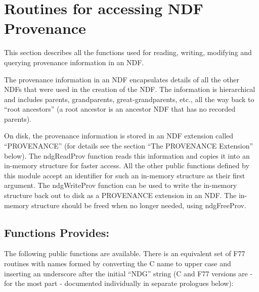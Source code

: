 \documentclass[twoside,11pt,nolof]{starlink}
\begin{document}
\newpage

\section{Routines for accessing NDF Provenance}

This section describes all the functions used for reading, writing,
modifying and querying provenance information in an NDF.

The provenance information in an NDF encapsulates details of all the
other NDFs that were used in the creation of the NDF. The information is
hierarchical and includes parents, grandparents, great-grandparents,
etc., all the way back to ``root ancestors'' (a root ancestor is an ancestor
NDF that has no recorded parents).

On disk, the provenance information is stored in an NDF extension called
``PROVENANCE'' (for details see the section ``The PROVENANCE Extension''
below). The ndgReadProv function reads this information and copies it
into an in-memory structure for faster access. All the other public
functions defined by this module accept an identifier for such an
in-memory structure as their first argument. The ndgWriteProv function
can be used to write the in-memory structure back out to disk as a
PROVENANCE extension in an NDF. The in-memory structure should be freed
when no longer needed, using ndgFreeProv.

\subsection{Functions Provides:}
The following public functions are available. There is an equivalent set
of F77 routines with names formed by converting the C name to upper case
and inserting an underscore after the initial ``NDG'' string (C and F77
versions are - for the most part - documented individually in separate
prologues below):
\end{document}
